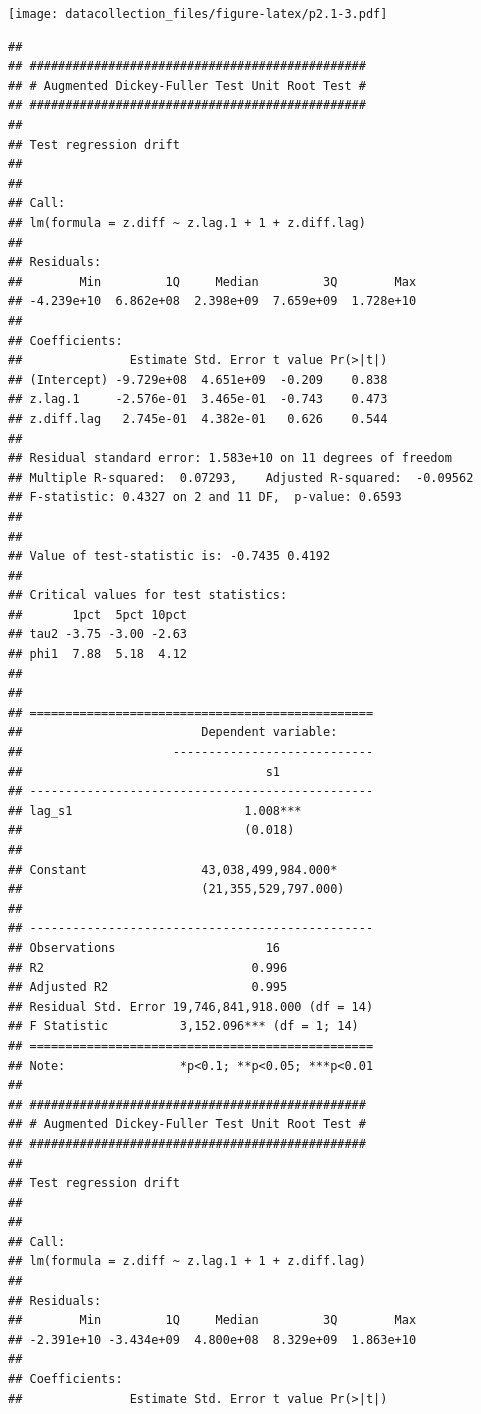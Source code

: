 \documentclass[
]{article}
\begin{document}
\texttt{[image: datacollection\_files/figure-latex/p2.1-3.pdf]}

\begin{verbatim}
## 
## ############################################### 
## # Augmented Dickey-Fuller Test Unit Root Test # 
## ############################################### 
## 
## Test regression drift 
## 
## 
## Call:
## lm(formula = z.diff ~ z.lag.1 + 1 + z.diff.lag)
## 
## Residuals:
##        Min         1Q     Median         3Q        Max 
## -4.239e+10  6.862e+08  2.398e+09  7.659e+09  1.728e+10 
## 
## Coefficients:
##               Estimate Std. Error t value Pr(>|t|)
## (Intercept) -9.729e+08  4.651e+09  -0.209    0.838
## z.lag.1     -2.576e-01  3.465e-01  -0.743    0.473
## z.diff.lag   2.745e-01  4.382e-01   0.626    0.544
## 
## Residual standard error: 1.583e+10 on 11 degrees of freedom
## Multiple R-squared:  0.07293,    Adjusted R-squared:  -0.09562 
## F-statistic: 0.4327 on 2 and 11 DF,  p-value: 0.6593
## 
## 
## Value of test-statistic is: -0.7435 0.4192 
## 
## Critical values for test statistics: 
##       1pct  5pct 10pct
## tau2 -3.75 -3.00 -2.63
## phi1  7.88  5.18  4.12
## 
## 
## ================================================
##                         Dependent variable:     
##                     ----------------------------
##                                  s1             
## ------------------------------------------------
## lag_s1                        1.008***          
##                               (0.018)           
##                                                 
## Constant                43,038,499,984.000*     
##                         (21,355,529,797.000)    
##                                                 
## ------------------------------------------------
## Observations                     16             
## R2                             0.996            
## Adjusted R2                    0.995            
## Residual Std. Error 19,746,841,918.000 (df = 14)
## F Statistic          3,152.096*** (df = 1; 14)  
## ================================================
## Note:                *p<0.1; **p<0.05; ***p<0.01
## 
## ############################################### 
## # Augmented Dickey-Fuller Test Unit Root Test # 
## ############################################### 
## 
## Test regression drift 
## 
## 
## Call:
## lm(formula = z.diff ~ z.lag.1 + 1 + z.diff.lag)
## 
## Residuals:
##        Min         1Q     Median         3Q        Max 
## -2.391e+10 -3.434e+09  4.800e+08  8.329e+09  1.863e+10 
## 
## Coefficients:
##               Estimate Std. Error t value Pr(>|t|)

\end{verbatim}
\end{document}

